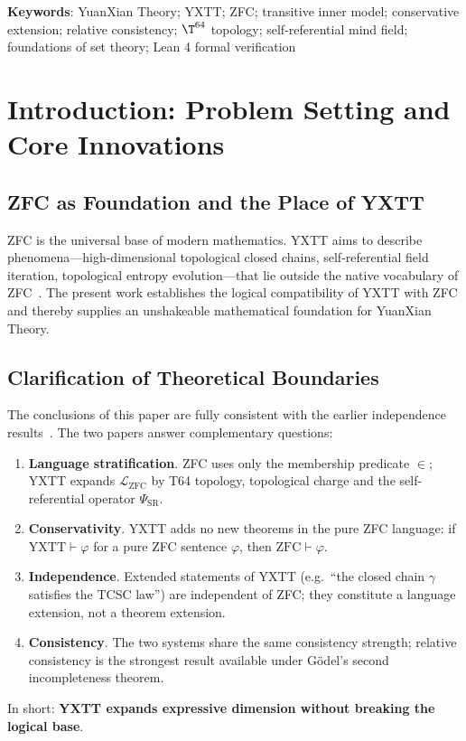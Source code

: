 \documentclass[12pt,a4paper]{article}
\theoremstyle{plain}
\theoremstyle{definition}
\newcommand{\PSR}{\Psi_{\mathrm{SR}}}
\newcommand{\YXTT}{\mathrm{YXTT}}
\newcommand{\ZFC}{\mathrm{ZFC}}
\begin{document}
\textbf{Keywords}: YuanXian Theory; YXTT; ZFC; transitive inner model; conservative extension; relative consistency; $\T^{64}$ topology; self-referential mind field; foundations of set theory; Lean 4 formal verification

\section{Introduction: Problem Setting and Core Innovations}
\label{sec:introduction}

\subsection{ZFC as Foundation and the Place of YXTT}
ZFC is the universal base of modern mathematics. YXTT aims to describe phenomena---high-dimensional topological closed chains, self-referential field iteration, topological entropy evolution---that lie outside the native vocabulary of ZFC~\cite{yxt2026axioms}. The present work establishes the logical compatibility of YXTT with ZFC and thereby supplies an unshakeable mathematical foundation for YuanXian Theory.

\subsection{Clarification of Theoretical Boundaries}
The conclusions of this paper are fully consistent with the earlier independence results~\cite{yxt2026independence}. The two papers answer complementary questions:
\begin{enumerate}
  \item \textbf{Language stratification}. ZFC uses only the membership predicate $\in$; YXTT expands $\mathcal{L}_{\ZFC}$ by T64 topology, topological charge and the self-referential operator $\PSR$.
  \item \textbf{Conservativity}. YXTT adds no new theorems in the pure ZFC language: if $\YXTT\vdash\varphi$ for a pure ZFC sentence $\varphi$, then $\ZFC\vdash\varphi$.
  \item \textbf{Independence}. Extended statements of YXTT (e.g.\ ``the closed chain $\gamma$ satisfies the TCSC law'') are independent of ZFC; they constitute a language extension, not a theorem extension.
  \item \textbf{Consistency}. The two systems share the same consistency strength; relative consistency is the strongest result available under Gödel's second incompleteness theorem.
\end{enumerate}
In short: \textbf{YXTT expands expressive dimension without breaking the logical base}.
\end{document}
